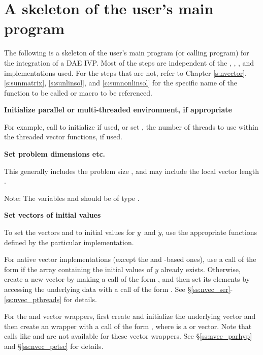 \section{A skeleton of the user's main program}\label{ss:skeleton_sim}
The following is a skeleton of the user's main program (or calling program)
for the integration of a DAE IVP. Most of the steps are independent of the
{\nvector}, {\sunmatrix}, {\sunlinsol}, and {\sunnonlinsol} implementations
used. For the steps that are not, refer to Chapter \ref{s:nvector},
\ref{s:sunmatrix}, \ref{s:sunlinsol}, and \ref{c:sunnonlinsol} for the specific
name of the function to be called or macro to be referenced.
\begin{Steps}

\item
  {\bf Initialize parallel or multi-threaded environment, if appropriate}

  For example, call  to initialize {\mpi} if used, or
  set , the number of threads to use within the threaded
  vector functions, if used.

\item
  {\bf Set problem dimensions etc.}

  This generally includes the problem size , and may include
  the local vector length .

  Note: The variables  and  should be of type .

\item
  {\bf Set vectors of initial values}

  To set the vectors  and  to initial values for $y$\ and
  $\dot{y}$, use the appropriate functions defined by the particular
  {\nvector} implementation.

  For native {\sundials} vector implementations
  (except the {\cuda} and {\raja}-based ones),
  use a call of the form  if the 
  array  containing the initial values of $y$ already exists.
  Otherwise, create a new vector by making a call of the form
  , and then set its elements by accessing
  the underlying data with a call of the form
  .
  See \S\ref{ss:nvec_ser}-\ref{ss:nvec_pthreads} for details.

  For the {\hypre} and {\petsc} vector wrappers, first create and initialize
  the underlying vector and then create an {\nvector} wrapper with a call
  of the form , where  is a {\hypre}
  or {\petsc} vector. Note that calls like  and
   are not available for these vector wrappers.
  See \S\ref{ss:nvec_parhyp} and \S\ref{ss:nvec_petsc} for details.


\end{Steps}
